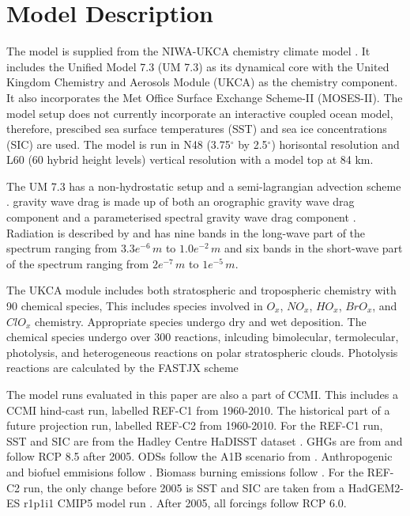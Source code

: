 \section{Model Description}

The model is supplied from the NIWA-UKCA chemistry climate model \cite{Morgenstern:2009bu}. It includes the Unified Model 7.3 (UM 7.3) as its dynamical core with the United Kingdom Chemistry and Aerosols Module (UKCA) as the chemistry component. It also incorporates the Met Office Surface Exchange Scheme-II (MOSES-II). The model setup does not currently incorporate an interactive coupled ocean model, therefore, prescibed sea surface temperatures (SST) and sea ice concentrations (SIC) are used. The model is run in N48 (3.75$^\circ$ by 2.5$^\circ$) horisontal resolution and L60 (60 hybrid height levels) vertical resolution with a model top at 84 km.

The UM 7.3 has a non-hydrostatic setup \cite{Davies:2005vu} and a semi-lagrangian advection scheme \cite{Priestley:1993ur}. gravity wave drag is made up of both an orographic gravity wave drag component \cite{Webster:2003vf} and a parameterised spectral gravity wave drag component \cite{Scaife:2002vt}. Radiation is described by \cite{Edwards:1996wo} and has nine bands in the long-wave part of the spectrum ranging from $3.3e^{-6}\,m$ to $1.0e^{-2}\,m$ and six bands in the short-wave part of the spectrum ranging from $2e^{-7}\,m$ to $1e^{-5}\,m$.

The UKCA module includes both stratospheric and tropospheric chemistry with 90 chemical species, This includes species involved in $O_x$, $NO_x$, $HO_x$, $BrO_x$, and $ClO_x$ chemistry. Appropriate species undergo dry and wet deposition. The chemical species undergo over 300 reactions, inlcuding bimolecular, termolecular, photolysis, and heterogeneous reactions on polar stratospheric clouds. Photolysis reactions are calculated by the FASTJX scheme \cite{Neu:2007wi}

The model runs evaluated in this paper are also a part of CCMI. This includes a CCMI hind-cast run, labelled REF-C1 from 1960-2010. The historical part of a future projection run, labelled REF-C2 from 1960-2010. For the REF-C1 run, SST and SIC are from the Hadley Centre HaDISST dataset \cite{Rayner:2003ty}. GHGs are from \cite{Meinshausen:2011is} \cite{Riahi:2011dk} and follow RCP 8.5 after 2005. ODSs follow the A1B scenario from \cite{WMO:2011vf}. Anthropogenic and biofuel emmisions follow \cite{Granier:2011dw}. Biomass burning emissions follow \cite{Lamarque:2011wr} \cite{vanderWerf:2006gi} \cite{Schultz:2008wf}. For the REF-C2 run, the only change before 2005 is SST and SIC are taken from a HadGEM2-ES r1p1i1 CMIP5 model run \cite{Jones:2011ii}. After 2005, all forcings follow RCP 6.0. 